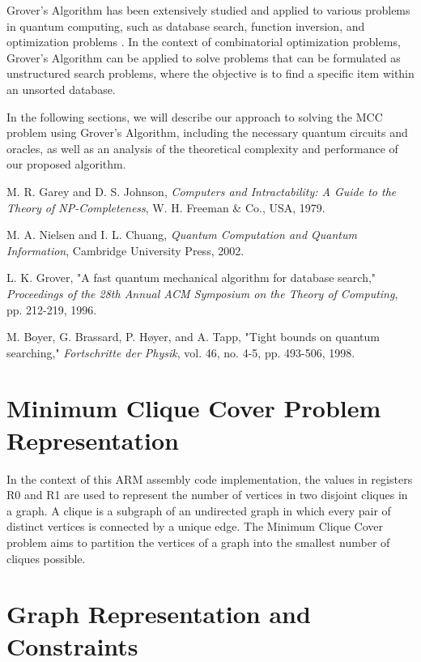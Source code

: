 Grover's Algorithm has been extensively studied and applied to various problems in quantum computing, such as database search, function inversion, and optimization problems \cite{nielsen2002quantum, boyer1998tight}. In the context of combinatorial optimization problems, Grover's Algorithm can be applied to solve problems that can be formulated as unstructured search problems, where the objective is to find a specific item within an unsorted database.

In the following sections, we will describe our approach to solving the MCC problem using Grover's Algorithm, including the necessary quantum circuits and oracles, as well as an analysis of the theoretical complexity and performance of our proposed algorithm.

\begin{thebibliography}{9}

M. R. Garey and D. S. Johnson, \textit{Computers and Intractability: A Guide to the Theory of NP-Completeness}, W. H. Freeman \& Co., USA, 1979.

M. A. Nielsen and I. L. Chuang, \textit{Quantum Computation and Quantum Information}, Cambridge University Press, 2002.

L. K. Grover, "A fast quantum mechanical algorithm for database search," \textit{Proceedings of the 28th Annual ACM Symposium on the Theory of Computing}, pp. 212-219, 1996.

M. Boyer, G. Brassard, P. Høyer, and A. Tapp, "Tight bounds on quantum searching," \textit{Fortschritte der Physik}, vol. 46, no. 4-5, pp. 493-506, 1998.

\end{thebibliography}

\section{Minimum Clique Cover Problem Representation}

In the context of this ARM assembly code implementation, the values in registers R0 and R1 are used to represent the number of vertices in two disjoint cliques in a graph. A clique is a subgraph of an undirected graph in which every pair of distinct vertices is connected by a unique edge. The Minimum Clique Cover problem aims to partition the vertices of a graph into the smallest number of cliques possible.

\section{Graph Representation and Constraints}

